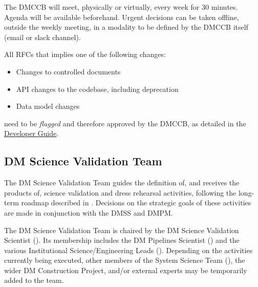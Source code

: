 The DMCCB will meet, physically or virtually, every week for 30 minutes. Agenda will be available beforehand.
Urgent decisions can be taken offline, outside the weekly meeting, in a modality to be defined by the DMCCB itself (email or slack channel).

All RFCs that implies one of the following changes:

\begin{itemize}
\item Changes to controlled documents
\item API changes to the codebase, including deprecation
\item Data model changes
\end{itemize}

need to be \textit{flagged} and therefore approved by the DMCCB, as detailed in the \href{https://developer.lsst.io/communications/rfc.html#rfc-exceptions}{Developer Guide}.


\subsection{DM Science Validation Team}
\label{sect:dmsvt}

The DM Science Validation Team guides the definition of, and receives the products of, science validation and dress rehearsal activities, following the long-term roadmap described in .
Decisions on the strategic goals of these activities are made in conjunction with the \gls{DMSS} and \gls{DMPM}.

The DM Science Validation Team is chaired by the DM Science Validation Scientist ().
Its membership includes the DM Pipelines Scientist () and the various Institutional Science/Engineering Leads ().
Depending on the activities currently being executed, other members of the System Science Team (), the wider DM Construction Project, and/or external experts may be temporarily added to the team.
